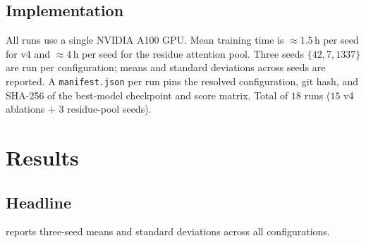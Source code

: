 \documentclass[11pt,a4paper]{article}
\begin{document}
\subsection{Implementation}
All runs use a single NVIDIA A100 GPU. Mean training time is
$\approx\!1.5$\,h per seed for v4 and $\approx\!4$\,h per seed for the
residue attention pool. Three seeds $\{42, 7, 1337\}$ are run per
configuration; means and standard deviations across seeds are reported.
A \texttt{manifest.json} per run pins the resolved configuration, git
hash, and SHA-256 of the best-model checkpoint and score matrix. Total
of $18$ runs ($15$ v4 ablations $+$ $3$ residue-pool seeds).

\section{Results}
\label{sec:results}

\subsection{Headline}

 reports three-seed means and standard deviations
across all configurations.
\end{document}

